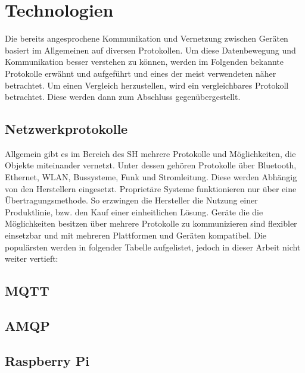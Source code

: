 \section{Technologien}
\label{sec:technologien}
    Die bereits angesprochene Kommunikation und Vernetzung zwischen Geräten basiert im Allgemeinen auf 
    diversen Protokollen. Um diese Datenbewegung und Kommunikation besser verstehen zu können, werden im 
    Folgenden bekannte Protokolle erwähnt und aufgeführt und eines der meist verwendeten näher betrachtet. 
    Um einen Vergleich herzustellen, wird ein vergleichbares Protokoll betrachtet. Diese werden dann zum 
    Abschluss gegenübergestellt. 

    \subsection{Netzwerkprotokolle}
    \label{subsec:netzwerkprotokolle}
    Allgemein gibt es im Bereich des \acl{SH} mehrere Protokolle und Möglichkeiten, die Objekte miteinander vernetzt. 
    Unter dessen gehören Protokolle über Bluetooth, Ethernet, WLAN, Bussysteme, Funk und Stromleitung. 
    Diese werden Abhängig von den Herstellern eingesetzt. Proprietäre Systeme funktionieren nur über eine 
    Übertragungsmethode. So erzwingen die Hersteller die Nutzung einer Produktlinie, bzw. den Kauf einer 
    einheitlichen Lösung. Geräte die die Möglichkeiten besitzen über mehrere Protokolle 
    zu kommunizieren sind flexibler einsetzbar und mit mehreren Plattformen und Geräten kompatibel.
    Die populärsten werden in folgender Tabelle aufgelistet, jedoch in dieser Arbeit nicht weiter vertieft:
    

    \subsection{MQTT}
    \label{subsec:mqtt}


    \subsection{AMQP}
    \label{subsec:amqp}

    
    \subsection{Raspberry Pi}
    \label{subsec:raspberrypi} 
